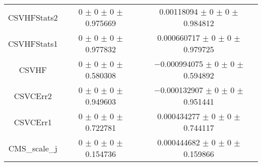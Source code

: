 \begin{table}
\begin{tabular}{ccc}
CSVHFStats2 	& \num{0} $\pm$ \num{0} $\pm$ \num{0} $\pm$ \num{0.975669} 	& \num{0.00118094} $\pm$ \num{0} $\pm$ \num{0} $\pm$ \num{0.984812}\\
CSVHFStats1 	& \num{0} $\pm$ \num{0} $\pm$ \num{0} $\pm$ \num{0.977832} 	& \num{0.000660717} $\pm$ \num{0} $\pm$ \num{0} $\pm$ \num{0.979725}\\
CSVHF 	& \num{0} $\pm$ \num{0} $\pm$ \num{0} $\pm$ \num{0.580308} 	& \num{-0.000994075} $\pm$ \num{0} $\pm$ \num{0} $\pm$ \num{0.594892}\\
CSVCErr2 	& \num{0} $\pm$ \num{0} $\pm$ \num{0} $\pm$ \num{0.949603} 	& \num{-0.000132907} $\pm$ \num{0} $\pm$ \num{0} $\pm$ \num{0.951441}\\
CSVCErr1 	& \num{0} $\pm$ \num{0} $\pm$ \num{0} $\pm$ \num{0.722781} 	& \num{0.000434277} $\pm$ \num{0} $\pm$ \num{0} $\pm$ \num{0.744117}\\
CMS\_scale\_j 	& \num{0} $\pm$ \num{0} $\pm$ \num{0} $\pm$ \num{0.154736} 	& \num{0.000444682} $\pm$ \num{0} $\pm$ \num{0} $\pm$ \num{0.159866}\\
\bottomrule
\end{tabular}
\end{table}